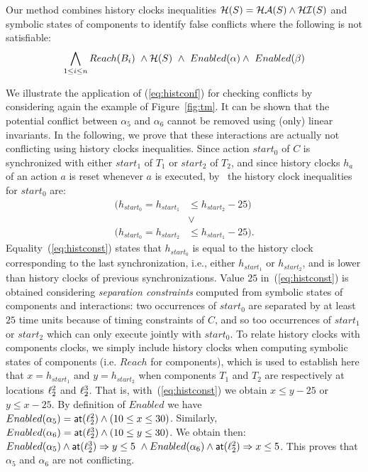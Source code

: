 Our method combines history clocks inequalities $\mathcal{H}(S)=\mathcal{HA}(S)\wedge\mathcal{HI}(S)$ 
and symbolic states of components to identify false conflicts where the following is not
satisfiable:
\begin{equation}\label{eq:histconf}
  \bigwedge_{1 \leq i \leq n} Reach(B_i) \ \wedge \mc{H}(S) \  \wedge \ \enabled{\alpha} 
  \wedge \ \enabled{\beta}
\end{equation}

\begin{example}
We illustrate the application of (\ref{eq:histconf}) for checking conflicts by 
considering again the example of Figure~\ref{fig:tm}.
It can be shown that the potential conflict between $\alpha_5$ and $\alpha_6$ 
cannot be removed using (only) linear invariants.
In the following, we prove that these interactions are actually not conflicting using 
history clocks inequalities.
Since action $start_0$ of $C$ is synchronized with either $start_1$ of $T_1$ or $start_2$ of 
$T_2$, and since history clocks $h_a$ of an action $a$ is reset whenever $a$ is executed, 
by~\cite{hs} the history clock inequalities for $start_0$ are:
\begin{equation}\label{eq:histconst}
\begin{split}
( h_{start_0} = h_{start_1} &\le h_{start_2} - 25 ) \\ 
  &\vee \\ ( h_{start_0} = h_{start_2} &\le h_{start_1} - 25 ).
\end{split}
\end{equation}
Equality~(\ref{eq:histconst}) states that $h_{start_0}$ is equal to the history clock 
corresponding to the last synchronization, i.e., either $h_{start_1}$ or $h_{start_2}$, and is 
lower than history clocks of previous synchronizations. Value $25$ in~(\ref{eq:histconst}) is 
obtained considering \emph{separation constraints} computed from symbolic states of components 
and interactions: two occurrences of $start_0$ are separated by at least $25$ 
time units because of timing constraints of $C$, and so too occurrences of $start_1$ or 
$start_2$ which can only execute jointly with $start_0$.
To relate history clocks with components clocks, we simply include history clocks when 
computing symbolic states of components (i.e. $Reach$ for components), which is used to 
establish here that $x = h_{start_1}$ and $y = h_{start_2}$ when components $T_1$ and $T_2$ 
are respectively at locations $\ell_2^2$ and $\ell_2^3$.
That is, with~(\ref{eq:histconst}) we obtain $x \le y - 25$ or $y \le x - 25$.
  By definition of $Enabled$ we have $Enabled(\alpha_5) = \textsf{at}(\ell_2^2) \wedge 
(10 \leq x \leq 30) $. 
  Similarly, $Enabled(\alpha_6) = \textsf{at}(\ell_2^3) \wedge (10\le y \leq 30)$.
  We obtain then: $Enabled(\alpha_5)\wedge\textsf{at}(\ell_2^3)\Rightarrow y\le5 \
  \wedge Enabled(\alpha_6)\wedge\textsf{at}(\ell_2^2)\Rightarrow x\le5$.
This proves that $\alpha_5$ and $\alpha_6$ are not conflicting. 
\end{example}

